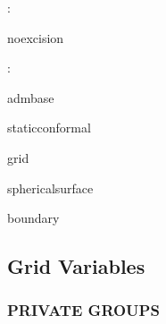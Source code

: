 : 

noexcision
\vspace{2mm}

: 

admbase

staticconformal

grid

sphericalsurface

boundary
\vspace{2mm}
\subsection*{Grid Variables}
\vspace{5mm}\subsubsection{PRIVATE GROUPS}

\vspace{5mm}

